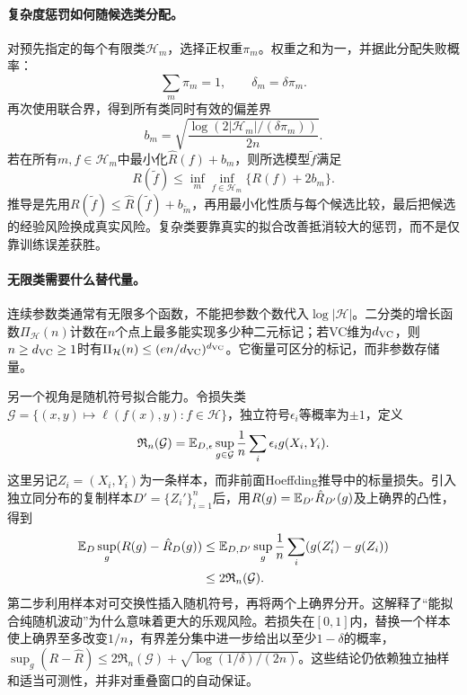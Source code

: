 \paragraph{复杂度惩罚如何随候选类分配。}
对预先指定的每个有限类$\mathcal H_m$，选择正权重$\pi_m$。权重之和为一，并据此分配失败概率：
\begin{equation*}
 \sum_m\pi_m=1,\qquad \delta_m=\delta\pi_m.
\end{equation*}
再次使用联合界，得到所有类同时有效的偏差界
\begin{equation}
 b_m=\sqrt{\frac{\log(2|\mathcal H_m|/(\delta\pi_m))}{2n}}.
\end{equation}
若在所有$m,f\in\mathcal H_m$中最小化$\hat R(f)+b_m$，则所选模型$\tilde f$满足
\begin{equation}
 R(\tilde f)\leq\inf_m\inf_{f\in\mathcal H_m}\{R(f)+2b_m\}.
\end{equation}
推导是先用$R(\tilde f)\leq\hat R(\tilde f)+b_{\tilde m}$，再用最小化性质与每个候选比较，最后把候选的经验风险换成真实风险。复杂类要靠真实的拟合改善抵消较大的惩罚，而不是仅靠训练误差获胜。

\paragraph{无限类需要什么替代量。}
连续参数类通常有无限多个函数，不能把参数个数代入$\log|\mathcal H|$。二分类的增长函数$\Pi_{\mathcal H}(n)$计数在$n$个点上最多能实现多少种二元标记；若VC维为$d_{\rm VC}$，则$n\geq d_{\rm VC}\geq1$时有$\Pi_{\mathcal H}(n)\leq(en/d_{\rm VC})^{d_{\rm VC}}$。它衡量可区分的标记，而非参数存储量。

另一个视角是随机符号拟合能力。令损失类$\mathcal G=\{(x,y)\mapsto\ell(f(x),y):f\in\mathcal H\}$，独立符号$\epsilon_i$等概率为$\pm1$，定义
\begin{equation}
 \mathfrak R_n(\mathcal G)=\mathbb{E}_{D,\epsilon}\sup_{g\in\mathcal G}
 \frac1n\sum_i\epsilon_i g(X_i,Y_i).
\end{equation}
这里另记$Z_i=(X_i,Y_i)$为一条样本，而非前面Hoeffding推导中的标量损失。引入独立同分布的复制样本$D'=\{Z_i'\}_{i=1}^n$后，用$R(g)=\mathbb{E}_{D'}\hat R_{D'}(g)$及上确界的凸性，得到
\begin{align}
 \mathbb{E}_D\sup_g(R(g)-\hat R_D(g))
 &\leq\mathbb{E}_{D,D'}\sup_g\frac1n\sum_i(g(Z_i')-g(Z_i))\\
 &\leq2\mathfrak R_n(\mathcal G).
\end{align}
第二步利用样本对可交换性插入随机符号，再将两个上确界分开。这解释了“能拟合纯随机波动”为什么意味着更大的乐观风险。若损失在$[0,1]$内，替换一个样本使上确界至多改变$1/n$，有界差分集中进一步给出以至少$1-\delta$的概率，$\sup_g(R-\hat R)\leq2\mathfrak R_n(\mathcal G)+\sqrt{\log(1/\delta)/(2n)}$。这些结论仍依赖独立抽样和适当可测性，并非对重叠窗口的自动保证。

